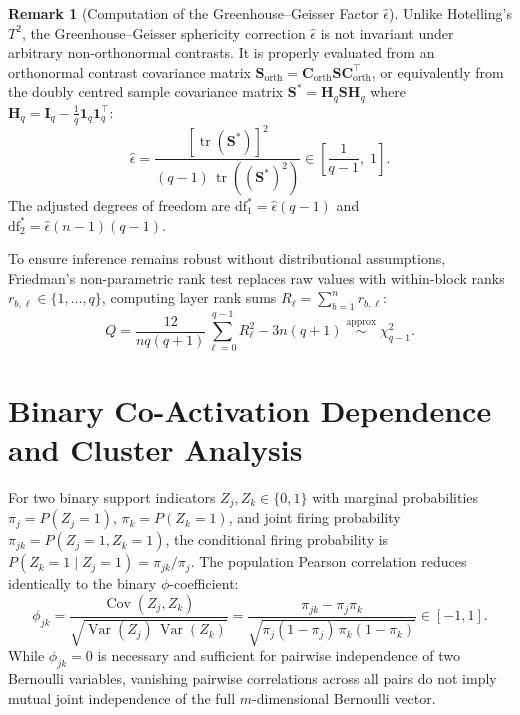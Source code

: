 \documentclass[12pt, a4paper, oneside]{report}
\theoremstyle{definition}
\newtheorem{remark}{Remark}[chapter]
\newcommand{\vect}[1]{\mathbf{#1}}
\newcommand{\mat}[1]{\mathbf{#1}}
\newcommand{\tr}{\operatorname{tr}}
\newcommand{\Var}{\operatorname{Var}}
\newcommand{\Cov}{\operatorname{Cov}}
\begin{document}
\begin{remark}[Computation of the Greenhouse--Geisser Factor $\hat{\epsilon}$]
Unlike Hotelling's $T^2$, the Greenhouse--Geisser sphericity correction $\hat{\epsilon}$ is not invariant under arbitrary non-orthonormal contrasts. It is properly evaluated from an orthonormal contrast covariance matrix $\mat{S}_{\text{orth}} = \mat{C}_{\text{orth}}\mat{S}\mat{C}_{\text{orth}}^\top$, or equivalently from the doubly centred sample covariance matrix $\mat{S}^* = \mat{H}_q \mat{S} \mat{H}_q$ where $\mat{H}_q = \mat{I}_q - \frac{1}{q}\vect{1}_q\vect{1}_q^\top$:
\begin{equation}
    \hat{\epsilon} = \frac{[\tr(\mat{S}^*)]^2}{(q - 1)\,\tr\!\left((\mat{S}^*)^2\right)} \in \left[\frac{1}{q - 1},\; 1\right].
    \label{eq:gg_epsilon}
\end{equation}
The adjusted degrees of freedom are $\mathrm{df}_1^* = \hat{\epsilon}(q - 1)$ and $\mathrm{df}_2^* = \hat{\epsilon}(n - 1)(q - 1)$.
\end{remark}

To ensure inference remains robust without distributional assumptions, Friedman's non-parametric rank test replaces raw values with within-block ranks $r_{b,\ell} \in \{1, \dots, q\}$, computing layer rank sums $R_\ell = \sum_{b=1}^n r_{b,\ell}$:
\begin{equation}
    Q = \frac{12}{n q (q + 1)} \sum_{\ell=0}^{q-1} R_\ell^2 - 3 n (q + 1) \;\stackrel{\text{approx}}{\sim}\; \chi^2_{q-1}.
    \label{eq:friedman}
\end{equation}

\section{Binary Co-Activation Dependence and Cluster Analysis}

For two binary support indicators $Z_j, Z_k \in \{0, 1\}$ with marginal probabilities $\pi_j = P(Z_j = 1)$, $\pi_k = P(Z_k = 1)$, and joint firing probability $\pi_{jk} = P(Z_j = 1, Z_k = 1)$, the conditional firing probability is $P(Z_k = 1 \mid Z_j = 1) = \pi_{jk} / \pi_j$. The population Pearson correlation reduces identically to the binary $\phi$-coefficient:
\begin{equation}
    \phi_{jk} = \frac{\Cov(Z_j, Z_k)}{\sqrt{\Var(Z_j)\,\Var(Z_k)}} = \frac{\pi_{jk} - \pi_j \pi_k}{\sqrt{\pi_j (1 - \pi_j)\,\pi_k (1 - \pi_k)}} \in [-1, 1].
    \label{eq:phi_coeff}
\end{equation}
While $\phi_{jk} = 0$ is necessary and sufficient for pairwise independence of two Bernoulli variables, vanishing pairwise correlations across all pairs do not imply mutual joint independence of the full $m$-dimensional Bernoulli vector.
\end{document}
